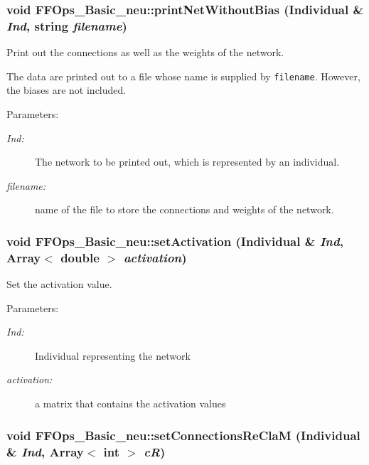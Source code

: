 \subsubsection{\setlength{\rightskip}{0pt plus 5cm}void FFOps\_\-Basic\_\-neu::print\-Net\-Without\-Bias (Individual \& {\em Ind}, string {\em filename})}\label{classFFOps__Basic__neu_a7}


Print out the connections as well as the weights of the network.

The data are printed out to a file whose name is supplied by {\tt filename}. However, the biases are not included. \begin{Desc}
\item[Parameters: ]\par
\begin{description}
\item[{\em 
Ind:}]The network to be printed out, which is represented by an individual. \item[{\em 
filename:}]name of the file to store the connections and weights of the network. \end{description}
\end{Desc}
\subsubsection{\setlength{\rightskip}{0pt plus 5cm}void FFOps\_\-Basic\_\-neu::set\-Activation (Individual \& {\em Ind}, Array$<$ double $>$ {\em activation})}\label{classFFOps__Basic__neu_a9}


Set the activation value.

\begin{Desc}
\item[Parameters: ]\par
\begin{description}
\item[{\em 
Ind:}]Individual representing the network \item[{\em 
activation:}]a matrix that contains the activation values \end{description}
\end{Desc}
\subsubsection{\setlength{\rightskip}{0pt plus 5cm}void FFOps\_\-Basic\_\-neu::set\-Connections\-Re\-Cla\-M (Individual \& {\em Ind}, Array$<$ int $>$ {\em c\-R})}\label{classFFOps__Basic__neu_a4}



